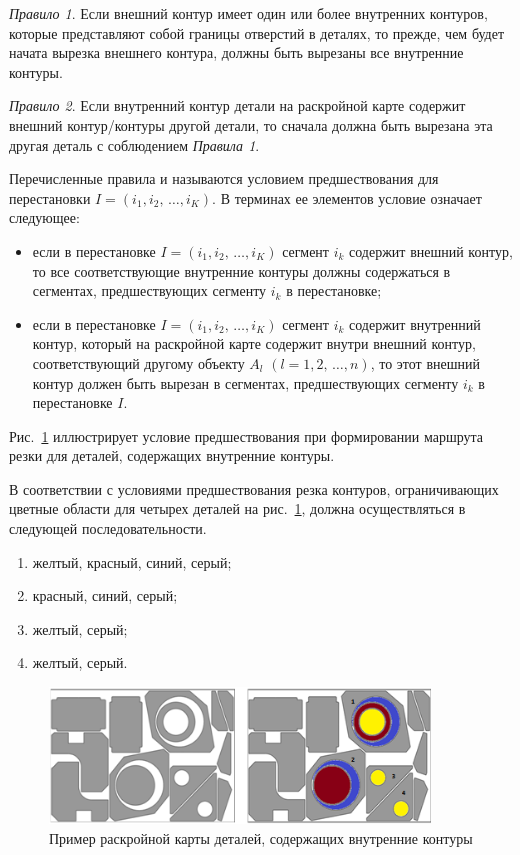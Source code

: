 \documentclass[11pt,twoside,openany]{report}
\begin{document}
{\it Правило 1}.
Если внешний контур имеет один или более внутренних контуров,
которые представляют собой границы отверстий в деталях,
то прежде, чем будет начата вырезка внешнего контура,
должны быть вырезаны все внутренние контуры.

{\it Правило 2}.
Если внутренний контур детали на раскройной карте
содержит внешний контур/контуры другой детали,
то сначала должна быть вырезана эта другая деталь
с соблюдением {\it Правила 1}.

Перечисленные правила и называются условием предшествования для перестановки
$ I = (i_1, i_2, \,\dots, i_K)$.
В терминах ее элементов условие означает следующее:
\begin{itemize}
  \item
  если в перестановке
  $ I = (i_1, i_2, \,\dots, i_K)$
  сегмент $i_k$
  содержит внешний контур,
  то все соответствующие внутренние контуры должны содержаться в сегментах,
  предшествующих сегменту $i_k$
  в перестановке;
  \item
  если в перестановке
  $ I = (i_1, i_2, \,\dots, i_K)$
  сегмент $i_k$
  содержит  внутренний контур,
  который на раскройной карте содержит внутри внешний контур,
  соответствующий другому объекту
  $A_l$
  $(l=1,2, \,\dots, n)$,
  то этот внешний контур должен быть вырезан в сегментах,
  предшествующих сегменту $i_k$ в перестановке $I$.
\end{itemize}

Рис.~\ref{precedence}
иллюстрирует условие предшествования
при формировании маршрута резки для деталей,
содержащих внутренние контуры.

В соответствии с условиями предшествования резка контуров,
ограничивающих цветные области для четырех деталей на
рис.~\ref{precedence},
должна осуществляться в следующей последовательности.
\begin{enumerate}
  \item желтый, красный, синий, серый;
  \item	красный, синий, серый;
  \item	желтый, серый;
  \item желтый, серый.
\end{enumerate}

\begin{figure}[h]
  \begin{center}
  \includegraphics[width=0.9\textwidth]{precedence.png}
  \caption{Пример раскройной карты деталей, содержащих внутренние контуры}
  \label{precedence}
  \end{center}
\end{figure}
\end{document}

